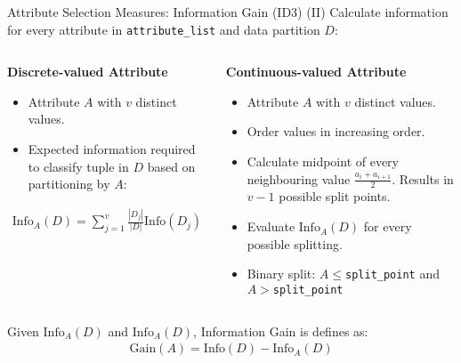 \begin{frame}{Attribute Selection Measures: Information Gain (ID3) (II)}
	Calculate information for every attribute in \texttt{attribute\_list} and data partition $D$:
	\vspace*{-1.5em}
	\begin{columns}
		\begin{column}{0.5\textwidth}
			\begin{center}
				\textbf{Discrete-valued Attribute}
			\end{center}
			\vspace*{-1em}
			\begin{itemize}
				\item Attribute $A$ with $v$ distinct values.
				\item Expected information required to classify tuple in $D$ based on partitioning by $A$:
			\end{itemize}
			\begin{align*}
				\text{Info}_A(D) = \sum_{j=1}^v \frac{|D_j|}{|D|} \text{Info}(D_j)
			\end{align*}
		\end{column}

		\begin{column}{0.5\textwidth}
			\begin{center}
				\textbf{Continuous-valued Attribute}
			\end{center}
			\vspace*{-1em}

			\begin{itemize}
				\item Attribute $A$ with $v$ distinct values.
				\item Order values in increasing order.
				\item Calculate midpoint of every neighbouring value
				      $\frac{a_i + a_{i+1}}{2}$. Results in $v-1$ possible split points.
				\item Evaluate $\text{Info}_A(D)$ for every possible splitting.
				\item Binary split: $A\leq$\texttt{split\_point} and  $A>$\texttt{split\_point}
			\end{itemize}
		\end{column}
	\end{columns}
	\vspace*{1.5em}
	Given $\text{Info}_A(D)$ and $\text{Info}_A(D)$, Information Gain is defines as:
	\begin{align*}
		\text{Gain}(A) = \text{Info}(D) - \text{Info}_A(D)
	\end{align*}
\end{frame}

